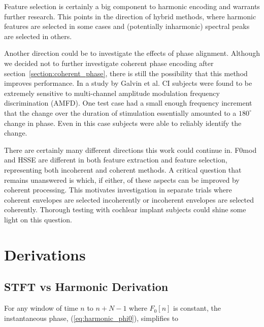 \documentclass [11pt, proquest,oneside] {ganter_thesis}[2015/03/03]
\begin{document}
Feature selection is certainly a big component to harmonic encoding and warrants further research.  This points in the direction of hybrid methods, where harmonic features are selected in some cases and (potentially inharmonic) spectral peaks are selected in others.

Another direction could be to investigate the effects of phase alignment.  Although we decided not to further investigate coherent phase encoding after section~\ref{section:coherent_phase}, there is still the possibility that this method improves performance.  In a study by Galvin et al. \cite{galvin2015envelope} CI subjects were found to be extremely sensitive to multi-channel amplitude modulation frequency discrimination (AMFD).  One test case had a small enough frequency increment that the change over the duration of stimulation essentially amounted to a $180^\circ$ change in phase.  Even in this case subjects were able to reliably identify the change.

There are certainly many different directions this work could continue in.  F0mod and HSSE are different in both feature extraction and feature selection, representing both incoherent and coherent methods.  A critical question that remains unanswered is which, if either, of these aspects can be improved by coherent processing.  This motivates investigation in separate trials where coherent envelopes are selected incoherently or incoherent envelopes are selected coherently.  Thorough testing with cochlear implant subjects could shine some light on this question.


%
%
\nocite{*}   %


%
%
\appendix
\raggedbottom\sloppy
 

\chapter{Derivations}

\section{STFT vs Harmonic Derivation}\label{section:stft_vs_harmonic_derivation}

For any window of time $n$ to $n + N - 1$ where $F_0[n]$ is constant, the instantaneous phase, (\ref{eq:harmonic_phi0}), simplifies to
\end{document}
